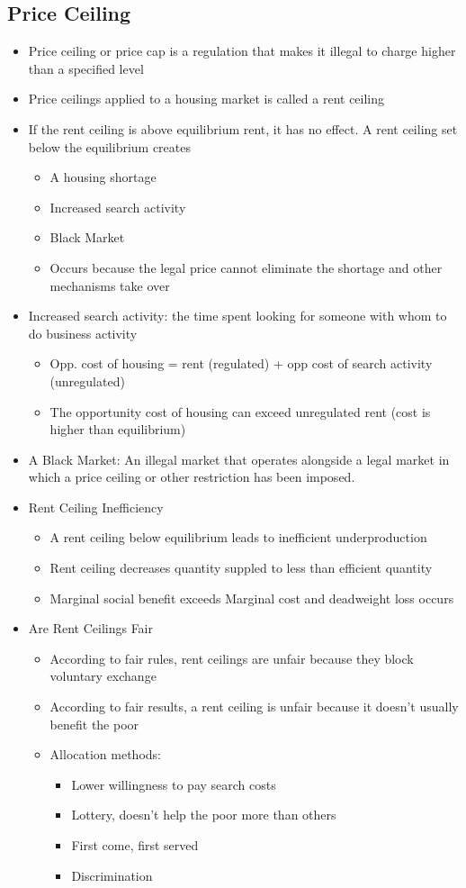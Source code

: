 \documentclass[11pt]{article}
\begin{document}
\subsection{Price Ceiling}
\label{sec:orgf29f986}
\begin{itemize}
\item Price ceiling or price cap is a regulation that makes it illegal to charge higher than a 
specified level
\item Price ceilings applied to a housing market is called a rent ceiling
\item If the rent ceiling is above equilibrium rent, it has no effect. 
A rent ceiling set below the equilibrium creates
\begin{itemize}
\item A housing shortage
\item Increased search activity
\item Black Market
\item Occurs because the legal price cannot eliminate the shortage and other mechanisms take over
\end{itemize}
\item Increased search activity: the time spent looking for someone with whom to do business activity
\begin{itemize}
\item Opp. cost of housing = rent (regulated) + opp cost of search activity (unregulated)
\item The opportunity cost of housing can exceed unregulated rent (cost is higher than equilibrium)
\end{itemize}
\item A Black Market: An illegal market that operates alongside a legal market in which a price ceiling
or other restriction has been imposed.
\item Rent Ceiling Inefficiency
\begin{itemize}
\item A rent ceiling below equilibrium leads to inefficient underproduction
\item Rent ceiling decreases quantity suppled to less than efficient quantity
\item Marginal social benefit exceeds Marginal cost and deadweight loss occurs
\end{itemize}
\item Are Rent Ceilings Fair
\begin{itemize}
\item According to fair rules, rent ceilings are unfair because they block voluntary exchange
\item According to fair results, a rent ceiling is unfair because it doesn't usually benefit the poor
\item Allocation methods:
\begin{itemize}
\item Lower willingness to pay search costs
\item Lottery, doesn't help the poor more than others
\item First come, first served
\item Discrimination
\end{itemize}
\end{itemize}
\end{itemize}
\end{document}
